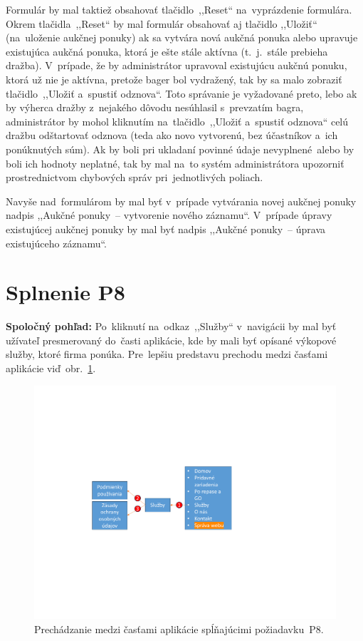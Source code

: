 Formulár by mal taktiež obsahovať tlačidlo~,,Reset`` na~vyprázdenie formulára. Okrem tlačidla~,,Reset`` by mal formulár obsahovať aj tlačidlo ,,Uložiť`` (na~uloženie aukčnej ponuky) ak sa vytvára nová aukčná ponuka alebo upravuje existujúca aukčná ponuka, ktorá je ešte stále aktívna (t.~j.~stále prebieha dražba). V~prípade, že by administrátor upravoval existujúcu aukčnú ponuku, ktorá už nie je aktívna, pretože bager bol vydražený, tak by sa malo zobraziť tlačidlo~,,Uložiť a~spustiť odznova``. Toto správanie je vyžadované preto, lebo ak by výherca dražby z~nejakého dôvodu nesúhlasil s~prevzatím bagra, administrátor by mohol kliknutím na~tlačidlo~,,Uložiť a~spustiť odznova`` celú dražbu odštartovať odznova (teda ako novo vytvorenú, bez účastníkov a~ich ponúknutých súm). Ak by boli pri ukladaní povinné údaje nevyplnené~alebo by boli ich hodnoty neplatné, tak by mal na~to systém administrátora upozorniť prostrednictvom chybových správ pri~jednotlivých poliach.

Navyše nad~formulárom by mal byť v~prípade vytvárania novej aukčnej ponuky nadpis ,,Aukčné ponuky~-- vytvorenie nového záznamu``. V~prípade úpravy existujúcej aukčnej ponuky by mal byť nadpis ,,Aukčné ponuky~-- úprava existujúceho záznamu``.

\section{Splnenie P8}
\label{splnenie p8}

\textbf{Spoločný pohľad:} Po~kliknutí na~odkaz~,,Služby`` v~navigácii by mal byť užívateľ presmerovaný do~časti aplikácie, kde by mali byť opísané výkopové služby, ktoré firma ponúka. Pre~lepšiu predstavu prechodu medzi časťami aplikácie viď~obr.~\ref{p8 graph}. 

\begin{figure}[H]\centering
\includegraphics[width=140mm]{../img/UI concept/p8 graph}
\caption{Prechádzanie medzi časťami aplikácie spĺňajúcimi požiadavku~P8.}
\label{p8 graph}
\end{figure}

